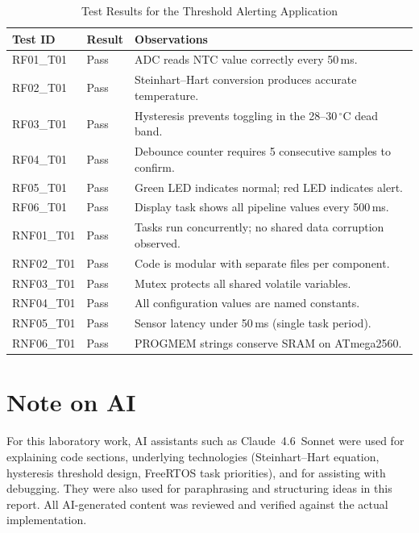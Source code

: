 \documentclass[12pt]{article}
\begin{document}
\begin{table}[H]
\centering
\begin{tabular}{@{}llp{7.5cm}@{}}
\toprule
\textbf{Test ID} & \textbf{Result} & \textbf{Observations} \\
\midrule
RF01\_T01  & Pass & ADC reads NTC value correctly every 50\,ms. \\
RF02\_T01  & Pass & Steinhart--Hart conversion produces accurate temperature. \\
RF03\_T01  & Pass & Hysteresis prevents toggling in the 28--30\,\(^{\circ}\)C dead band. \\
RF04\_T01  & Pass & Debounce counter requires 5 consecutive samples to confirm. \\
RF05\_T01  & Pass & Green LED indicates normal; red LED indicates alert. \\
RF06\_T01  & Pass & Display task shows all pipeline values every 500\,ms. \\
RNF01\_T01 & Pass & Tasks run concurrently; no shared data corruption observed. \\
RNF02\_T01 & Pass & Code is modular with separate files per component. \\
RNF03\_T01 & Pass & Mutex protects all shared volatile variables. \\
RNF04\_T01 & Pass & All configuration values are named constants. \\
RNF05\_T01 & Pass & Sensor latency under 50\,ms (single task period). \\
RNF06\_T01 & Pass & PROGMEM strings conserve SRAM on ATmega2560. \\
\bottomrule
\end{tabular}
\caption{Test Results for the Threshold Alerting Application}
\label{tab:tests}
\end{table}

\section{Note on AI}

\hspace{0.8cm}
For this laboratory work, AI assistants such as Claude~4.6~Sonnet were used for explaining code sections, underlying technologies (Steinhart--Hart equation, hysteresis threshold design, FreeRTOS task priorities), and for assisting with debugging. They were also used for paraphrasing and structuring ideas in this report. All AI-generated content was reviewed and verified against the actual implementation.
\end{document}
